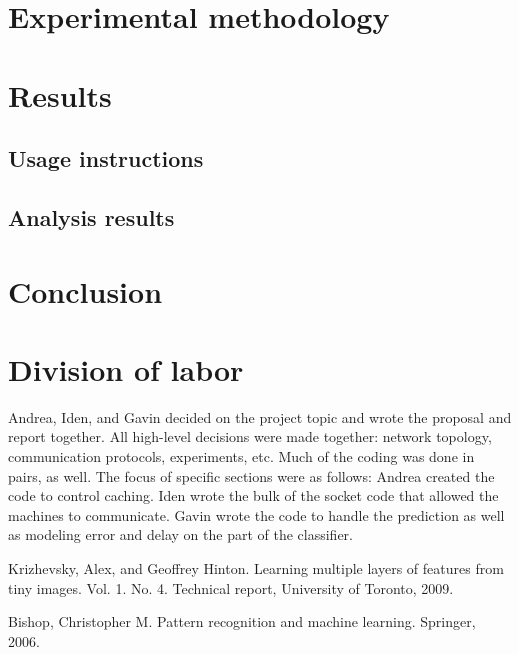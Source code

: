 \documentclass[12pt]{article}
\begin{document}
\section{Experimental methodology}

\section{Results}

\subsection{Usage instructions}
\subsection{Analysis results}

\section{Conclusion}

\section{Division of labor}

Andrea, Iden, and Gavin decided on the project topic and wrote the proposal and report together.
All high-level decisions were made together: network topology, communication protocols, experiments, etc.
Much of the coding was done in pairs, as well.
The focus of specific sections were as follows: Andrea created the code to control caching.
Iden wrote the bulk of the socket code that allowed the machines to communicate.
Gavin wrote the code to handle the prediction as well as modeling error and delay on the part of the classifier.


\begin{thebibliography}{1}
    Krizhevsky, Alex, and Geoffrey Hinton. Learning multiple layers of features from tiny images. Vol. 1. No. 4. Technical report, University of Toronto, 2009.

    Bishop, Christopher M. Pattern recognition and machine learning. Springer, 2006.

\end{thebibliography}
\end{document}

